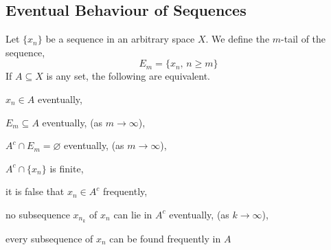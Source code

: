 \documentclass[../../main.tex]{subfiles}
\begin{document}
\providecommand{\xn}{\{x_n\}}
\subsection{Eventual Behaviour of Sequences}
\begin{wts}\label{theorem:eventual behaviour of sequences}
    Let $\xn$ be a sequence in an arbitrary space $X$. We define the $m$-tail of the sequence, 
    \[
    E_m = \{x_n,\,n\geq m\}
    \]
    If $A\subseteq X$ is any set, the following are equivalent.
    \begin{enumalpha}
        \item $x_n\in A$ eventually,\label{claim_ea}
        \item $E_m\subseteq A$ eventually, (as $m\to\infty$),\label{claim_eb}
        \item $A^c\cap E_m=\varnothing$ eventually, (as $m\to\infty$),\label{claim_ec}
        \item $A^c\cap \{x_n\}$ is finite,\label{claim_ed}
        \item it is false that $x_n\in A^c$ frequently,\label{claim_ee}
        \item no subsequence $x_{n_k}$ of $x_n$ can lie in $A^c$ eventually, (as $k\to\infty$),\label{claim_ef}
        \item every subsequence of $x_n$ can be found frequently in $A$\label{claim_eg}
    \end{enumalpha}
\end{wts}
\end{document}
